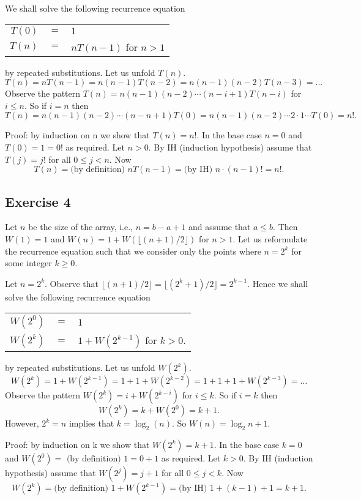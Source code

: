 \documentclass[english]{article}
\begin{document}
We shall solve the following recurrence equation
\begin{center}
\begin{tabular}{rcl}
$T(0)$ & $=$ & $1$ \\
$T(n)$ & $=$ & $nT(n-1)$ for $n>1$  
\end{tabular}
\end{center}
by repeated substitutions.
Let us unfold $T(n)$. 
$$T(n) = nT(n-1) = n(n-1)T(n-2) = n(n-1)(n-2)T(n-3) = ... $$
Observe the pattern
$T(n) = n(n-1)(n-2)\cdots(n-i+1)T(n-i)$
for $i \leq n$. So if $i = n$ then
$$T(n) = n(n-1)(n-2)\cdots(n-n+1)T(0)=
 n(n-1)(n-2)\cdots 2\cdot 1\cdots T(0) = n!.$$

Proof: by induction on n we show that $T(n)=n!$. In the base case
$n=0$ and $T(0)=1=0!$ as required. Let $n>0$.
By IH (induction hypothesis) assume that $T(j) = j!$ for all
$0 \leq j < n$. Now $$T(n) = \mbox{(by definition) } nT(n-1) =
\mbox{(by IH) }
n\cdot (n-1)! = n!.$$

\subsection*{Exercise 4}

Let $n$ be the size of the array, i.e., $n = b-a+1$ and assume
that $a \leq b$.
Then $W(1)= 1$ and $W(n)=1 + W( \lfloor (n+1)/2 \rfloor)$ for $n >1$.
Let us reformulate the recurrence equation such that we consider
only the points where $n = 2^k$ for some integer $k \geq 0$.

Let $n = 2^k$. Observe that $\lfloor (n+1)/2 \rfloor =
\lfloor (2^k+1)/2 \rfloor = 2^{k-1}$.
Hence we shall solve the following recurrence equation
\begin{center}
\begin{tabular}{rcl}
$W(2^0)$ & $=$ & $1$ \\
$W(2^k)$ & $=$ & $1 + W(2^{k-1})$ for $k > 0$. 
\end{tabular}
\end{center}
by repeated substitutions.
Let us unfold $W(2^k)$.
$$W(2^k) = 1 + W(2^{k-1}) =
 1 + 1 + W(2^{k-2}) = 
 1 + 1 + 1 + W(2^{k-3}) = \ldots$$
Observe the pattern
$W(2^k) = i + W(2^{k-i})$
for $i \leq k$. So if $i = k$ then
$$W(2^k) =  k + W(2^0) = k + 1.$$
However, $2^k = n$ implies that $k = \log_{2}(n)$.
So $W(n) = \log_{2}n + 1$.

Proof: by induction on k we show that $W(2^k)=k+1$. 
In the base case
$k=0$ and $W(2^0) = \mbox{ (by definition) }1 = 0+1$ 
as required. Let $k>0$.
By IH (induction hypothesis) assume that $W(2^j) =j+1$ for all
$0 \leq j < k$. Now $$W(2^k) = \mbox{(by definition) } 1 +  
W(2^{k-1}) = \mbox{(by IH) }
1 + (k-1) + 1 = k+1.$$
\end{document}
